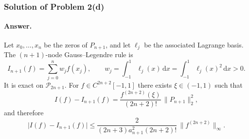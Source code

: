 \documentclass[11pt,a4paper]{article}
\begin{document}
\subsubsection{Solution of Problem 2(d)}

\paragraph{Answer.}
Let \(x_{0},\ldots,x_{n}\) be the zeros of \(P_{n+1}\), and let \(\ell_{j}\) be the associated Lagrange basis. The \((n+1)\)-node Gauss--Legendre rule is
\[
I_{n+1}(f)
=
\sum_{j=0}^{n}w_{j}f(x_{j}),
\qquad
w_{j}
=
\int_{-1}^{1}\ell_{j}(x)\,\mathrm{d}x
=
\int_{-1}^{1}\ell_{j}(x)^{2}\,\mathrm{d}x>0.
\]
It is exact on \(\mathcal{P}_{2n+1}\). For \(f\in C^{2n+2}[-1,1]\) there exists \(\xi\in(-1,1)\) such that
\[
I(f)-I_{n+1}(f)
=
\frac{f^{(2n+2)}(\xi)}{(2n+2)!}\,\|P_{n+1}\|_{2}^{2},
\]
and therefore
\[
\bigl\lvert I(f)-I_{n+1}(f)\bigr\rvert
\le
\frac{2}{(2n+3)a_{n+1}^{2}(2n+2)!}\,\|f^{(2n+2)}\|_{\infty}.
\]
\end{document}

